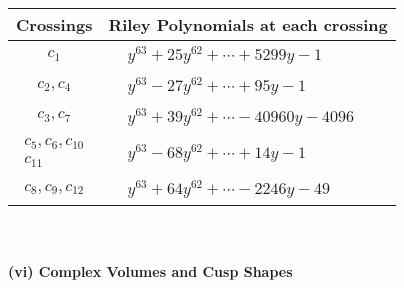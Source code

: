 \documentclass[1p]{elsarticle_modified}
\theoremstyle{definition}
\begin{document}
\begin{tabular}{m{50pt}|m{274pt}}
Crossings & \hspace{64pt}Riley Polynomials at each crossing \\
\hline $$\begin{aligned}c_{1}\end{aligned}$$&$\begin{aligned}
&y^{63}+25 y^{62}+\cdots+5299 y-1
\end{aligned}$\\
\hline $$\begin{aligned}c_{2},c_{4}\end{aligned}$$&$\begin{aligned}
&y^{63}-27 y^{62}+\cdots+95 y-1
\end{aligned}$\\
\hline $$\begin{aligned}c_{3},c_{7}\end{aligned}$$&$\begin{aligned}
&y^{63}+39 y^{62}+\cdots-40960 y-4096
\end{aligned}$\\
\hline $$\begin{aligned}c_{5},c_{6},c_{10}\\c_{11}\end{aligned}$$&$\begin{aligned}
&y^{63}-68 y^{62}+\cdots+14 y-1
\end{aligned}$\\
\hline $$\begin{aligned}c_{8},c_{9},c_{12}\end{aligned}$$&$\begin{aligned}
&y^{63}+64 y^{62}+\cdots-2246 y-49
\end{aligned}$\\
\hline
\end{tabular}\\~\\
\newpage\flushleft \textbf{(vi) Complex Volumes and Cusp Shapes}
\end{document}

